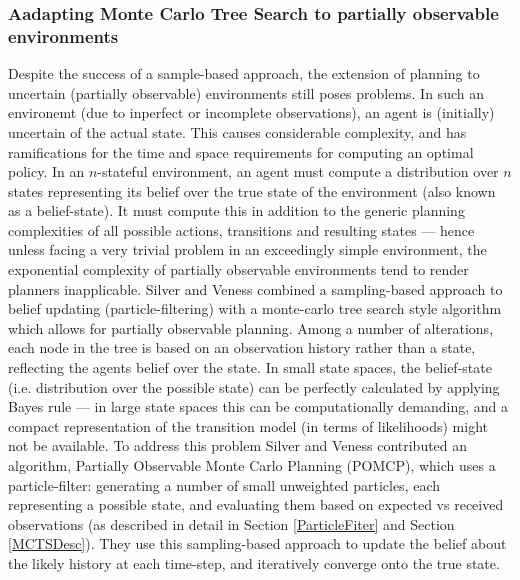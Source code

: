 \subsubsection{Aadapting Monte Carlo Tree Search to partially observable environments}
Despite the success of a sample-based approach, the extension of planning to uncertain (partially observable) environments still poses problems. 
In such an environemt (due to inperfect or incomplete observations), an agent is (initially) uncertain of the actual state. This causes considerable complexity, and has ramifications for the time and space requirements for computing an optimal policy. 
\newline \newline
In an $n$-stateful environment, an agent must compute a distribution over $n$ states representing its belief over the true state of the environment (also known as a belief-state). 
It must compute this in addition to the generic planning complexities of all possible actions, transitions and resulting states --- hence unless facing a very trivial problem in an exceedingly simple environment, the exponential complexity of partially observable environments tend to render planners inapplicable. 
\newline \newline
Silver and Veness  \cite{Silver2010} combined a sampling-based approach to belief updating (particle-filtering) with a monte-carlo tree search style algorithm which allows for partially observable planning. Among a number of alterations, each node in the tree is based on an observation history rather than a state, reflecting the agents belief over the state.  
\newline \newline
In small state spaces, the belief-state (i.e. distribution over the possible state) can be perfectly calculated by applying Bayes rule --- in large state spaces this can be computationally demanding, and a compact representation of the transition model (in terms of likelihoods) might not be available. To address this problem Silver and Veness contributed an algorithm, Partially Observable Monte Carlo Planning (POMCP), which uses a particle-filter: generating a number of small unweighted particles, each representing a possible state, and evaluating them based on expected vs received observations (as described in detail in Section \ref{ParticleFiter} and Section \ref{MCTSDesc}). They use this sampling-based approach to update the belief about the likely history at each time-step, and iteratively converge onto the true state.

